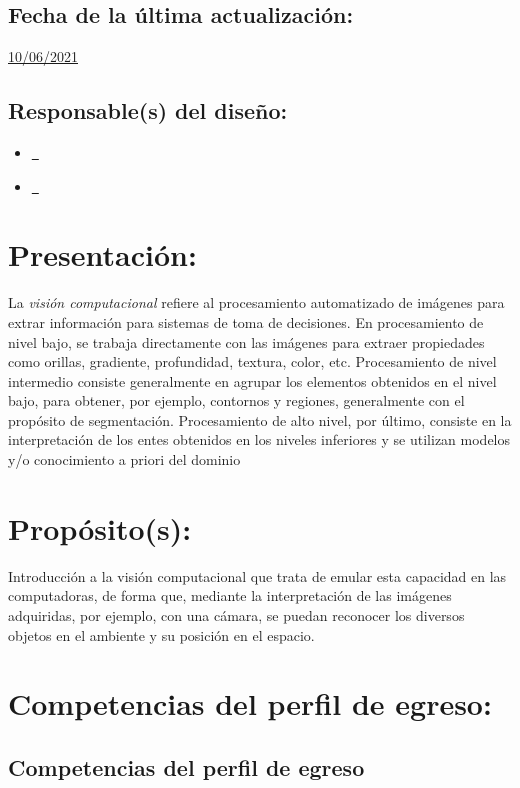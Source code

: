 \documentclass[10 pt]{article}
\begin{document}
\subsection{Fecha de la \'{u}ltima actualizaci\'{o}n:} \underline{10/06/2021}
\subsection{Responsable(s) del dise\~{n}o:}
\begin{itemize}[label={}]
\item \underline{\narturo~\arturo}
\item \underline{\nelisa~\elisa}
\end{itemize}
\newpage
\section{Presentaci\'{o}n:}

La {\em visi\'{o}n computacional} refiere al procesamiento
automatizado de im\'{a}genes para extrar informaci\'{o}n para sistemas
de toma de decisiones.  En procesamiento de nivel bajo, se trabaja
directamente con las im\'{a}genes para extraer propiedades como
orillas, gradiente, profundidad, textura, color, etc. Procesamiento de
nivel intermedio consiste generalmente en agrupar los elementos
obtenidos en el nivel bajo, para obtener, por ejemplo, contornos y
regiones, generalmente con el prop\'{o}sito de
segmentaci\'{o}n. Procesamiento de alto nivel, por \'{u}ltimo,
consiste en la interpretaci\'{o}n de los entes obtenidos en los
niveles inferiores y se utilizan modelos y/o conocimiento a priori del
dominio

\section{Prop\'{o}sito(s):}

Introducci\'{o}n a la visi\'{o}n computacional que trata de emular esta
capacidad en las computadoras, de forma que, mediante la
interpretaci\'{o}n de las im\'{a}genes adquiridas, por ejemplo, con una
c\'{a}mara, se puedan reconocer los diversos objetos en el ambiente y su
posici\'{o}n en el espacio.

\section{Competencias del perfil de egreso:}
\subsection{Competencias del perfil de egreso}
\end{document}
